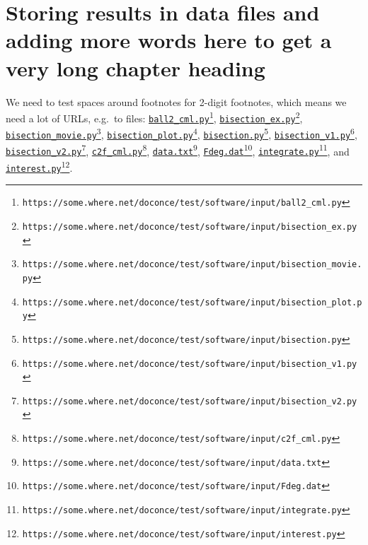 \documentclass[graybox,sectrefs,envcountresetchap,open=right,final]{svmonodo}
\begin{document}
\noindent
\chapter{Storing results in data files and adding more words here to get a very long chapter heading}

We need to test spaces around footnotes for 2-digit footnotes, which
means we need a lot of URLs, e.g.~to files:
\href{{https://some.where.net/doconce/test/software/input/ball2_cml.py}}{\nolinkurl{ball2_cml.py}\footnote{\texttt{https://some.where.net/doconce/test/software/input/ball2\_cml.py}}},
\href{{https://some.where.net/doconce/test/software/input/bisection_ex.py}}{\nolinkurl{bisection_ex.py}\footnote{\texttt{https://some.where.net/doconce/test/software/input/bisection\_ex.py}}},
\href{{https://some.where.net/doconce/test/software/input/bisection_movie.py}}{\nolinkurl{bisection_movie.py}\footnote{\texttt{https://some.where.net/doconce/test/software/input/bisection\_movie.py}}},
\href{{https://some.where.net/doconce/test/software/input/bisection_plot.py}}{\nolinkurl{bisection_plot.py}\footnote{\texttt{https://some.where.net/doconce/test/software/input/bisection\_plot.py}}},
\href{{https://some.where.net/doconce/test/software/input/bisection.py}}{\nolinkurl{bisection.py}\footnote{\texttt{https://some.where.net/doconce/test/software/input/bisection.py}}},
\href{{https://some.where.net/doconce/test/software/input/bisection_v1.py}}{\nolinkurl{bisection_v1.py}\footnote{\texttt{https://some.where.net/doconce/test/software/input/bisection\_v1.py}}},
\href{{https://some.where.net/doconce/test/software/input/bisection_v2.py}}{\nolinkurl{bisection_v2.py}\footnote{\texttt{https://some.where.net/doconce/test/software/input/bisection\_v2.py}}},
\href{{https://some.where.net/doconce/test/software/input/c2f_cml.py}}{\nolinkurl{c2f_cml.py}\footnote{\texttt{https://some.where.net/doconce/test/software/input/c2f\_cml.py}}},
\href{{https://some.where.net/doconce/test/software/input/data.txt}}{\nolinkurl{data.txt}\footnote{\texttt{https://some.where.net/doconce/test/software/input/data.txt}}},
\href{{https://some.where.net/doconce/test/software/input/Fdeg.dat}}{\nolinkurl{Fdeg.dat}\footnote{\texttt{https://some.where.net/doconce/test/software/input/Fdeg.dat}}},
\href{{https://some.where.net/doconce/test/software/input/integrate.py}}{\nolinkurl{integrate.py}\footnote{\texttt{https://some.where.net/doconce/test/software/input/integrate.py}}}, and
\href{{https://some.where.net/doconce/test/software/input/interest.py}}{\nolinkurl{interest.py}\footnote{\texttt{https://some.where.net/doconce/test/software/input/interest.py}}}.
\end{document}
